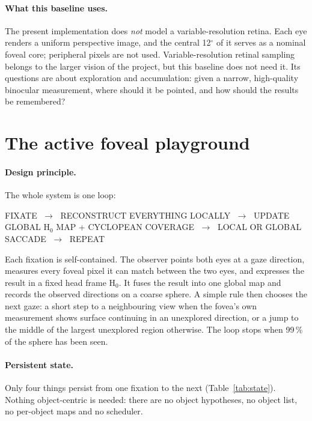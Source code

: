 \documentclass[11pt,a4paper]{article}
\newcommand{\Hz}{\ensuremath{\mathrm{H}_0}}
\newcommand{\pct}[1]{#1\,\%}
\newcommand{\degr}{\ensuremath{^\circ}}
\begin{document}
\paragraph{What this baseline uses.} The present implementation does \emph{not} model a variable-resolution retina. Each
eye renders a uniform perspective image, and the central 12\degr{} of it serves as a nominal foveal core; peripheral
pixels are not used. Variable-resolution retinal sampling belongs to the larger vision of the project, but this
baseline does not need it. Its questions are about exploration and accumulation: given a narrow, high-quality
binocular measurement, where should it be pointed, and how should the results be remembered?

\section{The active foveal playground}\label{sec:playground}

\paragraph{Design principle.} The whole system is one loop:
\begin{center}
\sffamily FIXATE $\;\rightarrow\;$ RECONSTRUCT EVERYTHING LOCALLY $\;\rightarrow\;$
UPDATE GLOBAL \Hz{} MAP + CYCLOPEAN COVERAGE $\;\rightarrow\;$ LOCAL OR GLOBAL SACCADE $\;\rightarrow\;$ REPEAT
\end{center}
Each fixation is self-contained. The observer points both eyes at a gaze direction, measures every foveal pixel it can
match between the two eyes, and expresses the result in a fixed head frame \Hz{}. It fuses the result into one global
map and records the observed directions on a coarse sphere. A simple rule then chooses the next gaze: a short step to a
neighbouring view when the fovea's own measurement shows surface continuing in an unexplored direction, or a jump to
the middle of the largest unexplored region otherwise. The loop stops when \pct{99} of the sphere has been seen.

\paragraph{Persistent state.} Only four things persist from one fixation to the next (Table~\ref{tab:state}). Nothing
object-centric is needed: there are no object hypotheses, no object list, no per-object maps and no scheduler.
\end{document}
